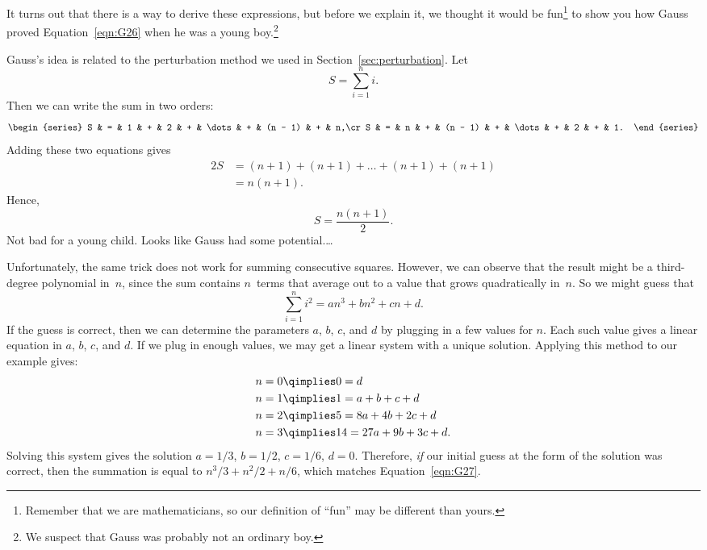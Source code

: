 It turns out that there is a way to derive these expressions, but
before we explain it, we thought it would be fun\footnote{Remember
  that we are mathematicians, so our definition of ``fun'' may be
  different than yours.} to show you how Gauss proved
Equation~\ref{eqn:G26} when he was a young boy.\footnote{We suspect
  that Gauss was probably not an ordinary boy.}

Gauss's idea is related to the perturbation method we used in
Section~\ref{sec:perturbation}.  Let
\begin{equation*}
    S = \sum_{i = 1}^n i.
\end{equation*}
Then we can write the sum in two orders:
\begin{equation*}
    \begin{series}
        S & = & 1 & + & 2       & + & \dots & + & (n - 1) & + & n,\cr
        S & = & n & + & (n - 1) & + & \dots & + & 2       & + & 1.
    \end{series}
\end{equation*}
Adding these two equations gives
\begin{align*}
    2S  & = (n + 1) + (n + 1) + \dots + (n + 1) + (n + 1) \\
        & = n (n + 1).
\end{align*}
Hence,
\begin{equation*}
    S = \frac{n (n + 1)}{2}.
\end{equation*}
Not bad for a young child.  Looks like Gauss had some potential.\dots

Unfortunately, the same trick does not work for summing consecutive
squares.  However, we can observe that the result might be a
third-degree polynomial in~$n$, since the sum contains $n$~terms that
average out to a value that grows quadratically in~$n$.  So we might
guess that
\begin{equation*}
    \sum_{i=1}^n i^2 = an^3 + bn^2 + cn + d.
\end{equation*}
If the guess is correct, then we can determine the parameters $a$,
$b$, $c$, and $d$ by plugging in a few values for $n$.  Each such
value gives a linear equation in $a$, $b$, $c$, and $d$.  If we plug
in enough values, we may get a linear system with a unique solution.
Applying this method to our example gives:
\begin{align*}
n = 0 & \qimplies  0 = d \\
n = 1 & \qimplies  1 = a + b + c + d \\
n = 2 & \qimplies  5 = 8a + 4b + 2c + d \\
n = 3 & \qimplies  14 = 27a + 9b + 3c + d.
\end{align*}
Solving this system gives the solution $a = 1/3$, $b = 1/2$, $c =
1/6$, $d = 0$.  Therefore, \emph{if} our initial guess at the form of
the solution was correct, then the summation is equal to $n^3/3 +
n^2/2 + n/6$, which matches Equation~\ref{eqn:G27}.


